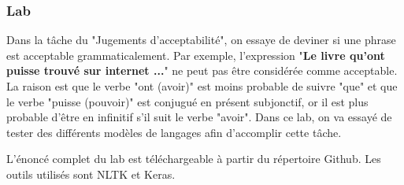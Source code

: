 \documentclass{KodeBook}
\begin{document}
\subsubsection*{Lab}

Dans la tâche du "Jugements d'acceptabilité", on essaye de deviner si une phrase est acceptable grammaticalement. 
Par exemple, l'expression "\textbf{Le livre qu'ont puisse trouvé sur internet ...}" ne peut pas être considérée comme acceptable. 
La raison est que le verbe "ont (avoir)" est moins probable de suivre "que" et que le verbe "puisse (pouvoir)" est conjugué en présent subjonctif, or il est plus probable d'être en infinitif s'il suit le verbe "avoir".
Dans ce lab, on va essayé de tester des différents modèles de langages afin d'accomplir cette tâche.

L'énoncé complet du lab est téléchargeable à partir du répertoire Github.
Les outils utilisés sont NLTK et Keras.

\ifx\wholebook\relax\else
% 
% 
	
\end{document}
